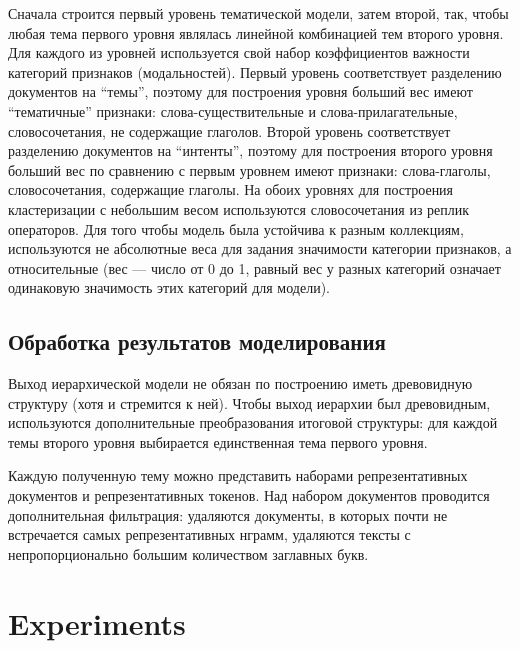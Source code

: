Сначала строится первый уровень тематической модели, затем второй, так, чтобы любая тема первого уровня являлась линейной комбинацией тем второго уровня. Для каждого из уровней используется свой набор коэффициентов важности категорий признаков (модальностей).
Первый уровень соответствует разделению документов на “темы”, поэтому для построения уровня больший вес имеют “тематичные” признаки: слова-существительные и слова-прилагательные, словосочетания, не содержащие глаголов.
Второй уровень соответствует разделению документов на “интенты”, поэтому для построения второго уровня больший вес по сравнению с первым уровнем имеют признаки: слова-глаголы, словосочетания, содержащие глаголы.
На обоих уровнях для построения кластеризации с небольшим весом используются словосочетания из реплик операторов. Для того чтобы модель была устойчива к разным коллекциям, используются не абсолютные веса для задания значимости категории признаков, а относительные (вес — число от 0 до 1, равный вес у разных категорий означает одинаковую значимость этих категорий для модели).

\subsection{Обработка результатов моделирования}

Выход иерархической модели не обязан по построению иметь древовидную структуру (хотя и стремится к ней). Чтобы выход иерархии был древовидным, используются дополнительные преобразования итоговой структуры: для каждой темы второго уровня выбирается единственная тема первого уровня.

Каждую полученную тему можно представить наборами репрезентативных документов и репрезентативных токенов. Над набором документов проводится дополнительная фильтрация: удаляются документы, в которых почти не встречается самых репрезентативных нграмм, удаляются тексты с непропорционально большим количеством заглавных букв.

\section{Experiments}

